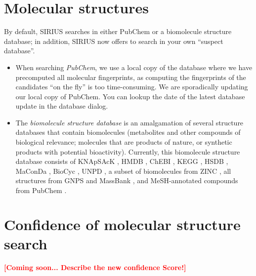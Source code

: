 \documentclass[letterpaper,10pt,openany,oneside]{sphinxmanual}
\newcommand{\todo}[1]{\xspace{\bfseries\sffamily\textcolor{red}{[#1]}}\xspace}
\begin{document}

\section{Molecular structures}

By default, SIRIUS searches in either PubChem or a biomolecule structure
database; in addition, SIRIUS now offers to search in your own ``suspect
database''.
%
\begin{itemize}
\item When searching \emph{PubChem}, we use a local copy of the database
  where we have precomputed all molecular fingerprints, as computing the
  fingerprints of the candidates ``on the fly'' is too time-consuming.  We
  are sporadically updating our local copy of PubChem.  
  You can lookup the date of the latest database update in the database dialog.

\item The \emph{biomolecule structure database} is an amalgamation of several
  structure databases that contain biomolecules (metabolites and other
  compounds of biological relevance; molecules that are products of nature,
  or synthetic products with potential bioactivity).  Currently, this
  biomolecule structure database consists of KNApSAcK \citep{shinbo06plant},
  HMDB \citep{wishart13hmdb}, ChEBI \citep{hastings13chebi},
  KEGG \citep{kanehisa16kegg}, HSDB \citep{fonger14national},
  MaConDa \citep{weber12maconda}, BioCyc \citep{caspi14metacyc},
  UNPD \citep{gu03unpd}, a subset of biomolecules from
  ZINC \citep{irwin12zinc}, all structures from GNPS \citep{wang16sharing}
  and MassBank \citep{horai10massbank}, and MeSH-annotated compounds from
  PubChem \citep{nelson01relationships, kim16pubchem}.
\end{itemize}


\section{Confidence of molecular structure search}
\todo{Coming soon... Describe the new confidence Score!}
\end{document}
